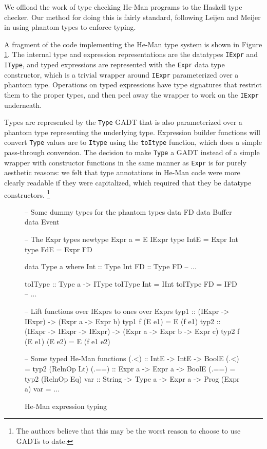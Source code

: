\documentclass[preprint]{sigplanconf}
\renewcommand{\t}{\texttt}
\begin{document}
We offload the work of type checking He-Man programs to the Haskell type
checker. Our method for doing this is fairly standard, following Leijen and
Meijer \cite{LeijenMeijer} in using phantom types to enforce typing.

A fragment of the code implementing the He-Man type system is shown in
Figure \ref{fig:types}. The internal type and expression
representations are the datatypes \t{IExpr} and \t{IType}, and
typed expressions are represented with the \t{Expr} data type
constructor, which is a trivial wrapper around \t{IExpr} parameterized
over a phantom type. Operations on typed expressions have type
signatures that restrict them to the proper types, and then peel away
the wrapper to work on the \t{IExpr} underneath.

Types are represented by the \t{Type} GADT that is also parameterized
over a phantom type representing the underlying type. Expression
builder functions will convert \t{Type} values are to \t{Itype} using
the \t{toItype} function, which does a simple pass-through conversion.
The decision to make \t{Type} a GADT instead of a simple wrapper with
constructor functions in the same manner as \t{Expr} is for purely
aesthetic reasons: we felt that type annotations in He-Man code were
more clearly readable if they were capitalized, which required that
they be datatype constructors.
\footnote{The authors believe that this may be the worst reason to
  choose to use GADTs to date.}

\begin{figure}[ht]
\centering
\begin{code}
-- Some dummy types for the phantom types
data FD
data Buffer
data Event

-- The Expr types
newtype Expr a = E IExpr
type IntE = Expr Int
type FdE = Expr FD

data Type a where
  Int :: Type Int
  FD :: Type FD
  -- ...

toIType :: Type a -> IType
toIType Int = IInt
toIType FD = IFD
-- ...

-- Lift functions over IExprs to ones over Exprs
typ1 :: (IExpr -> IExpr) -> (Expr a -> Expr b)
typ1 f (E e1) = E (f e1)
typ2 :: (IExpr -> IExpr -> IExpr) ->
        (Expr a -> Expr b -> Expr c)
typ2 f (E e1) (E e2) = E (f e1 e2)

-- Some typed He-Man functions
(.<) :: IntE -> IntE -> BoolE
(.<) = typ2 (RelnOp Lt)
(.==) :: Expr a -> Expr a -> BoolE
(.==) = typ2 (RelnOp Eq)
var :: String -> Type a -> Expr a -> Prog (Expr a)
var = ...
\end{code}
\caption{He-Man expression typing} %
\label{fig:types}
\end{figure}
\end{document}
